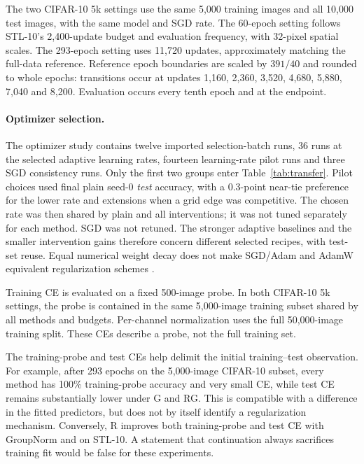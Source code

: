 The two CIFAR-10 5k settings use the same 5,000 training images and all 10,000 test images, with the same model and SGD rate. The 60-epoch setting follows STL-10's 2,400-update budget and evaluation frequency, with 32-pixel spatial scales. The 293-epoch setting uses 11,720 updates, approximately matching the full-data reference. Reference epoch boundaries are scaled by $391/40$ and rounded to whole epochs: transitions occur at updates 1,160, 2,360, 3,520, 4,680, 5,880, 7,040 and 8,200. Evaluation occurs every tenth epoch and at the endpoint.

\paragraph{Optimizer selection.}
The optimizer study contains twelve imported selection-batch runs, 36 runs at the selected adaptive learning rates, fourteen learning-rate pilot runs and three SGD consistency runs. Only the first two groups enter Table~\ref{tab:transfer}. Pilot choices used final plain seed-0 \emph{test} accuracy, with a 0.3-point near-tie preference for the lower rate and extensions when a grid edge was competitive. The chosen rate was then shared by plain and all interventions; it was not tuned separately for each method. SGD was not retuned. The stronger adaptive baselines and the smaller intervention gains therefore concern different selected recipes, with test-set reuse. Equal numerical weight decay does not make SGD/Adam and AdamW equivalent regularization schemes \citep{loshchilov2019decoupled}.




Training CE is evaluated on a fixed 500-image probe. In both CIFAR-10 5k settings, the probe is contained in the same 5,000-image training subset shared by all methods and budgets. Per-channel normalization uses the full 50,000-image training split. These CEs describe a probe, not the full training set.

The training-probe and test CEs help delimit the initial training--test observation. For example, after 293 epochs on the 5,000-image CIFAR-10 subset, every method has 100\% training-probe accuracy and very small CE, while test CE remains substantially lower under G and RG. This is compatible with a difference in the fitted predictors, but does not by itself identify a regularization mechanism. Conversely, R improves both training-probe and test CE with GroupNorm and on STL-10. A statement that continuation always sacrifices training fit would be false for these experiments.

